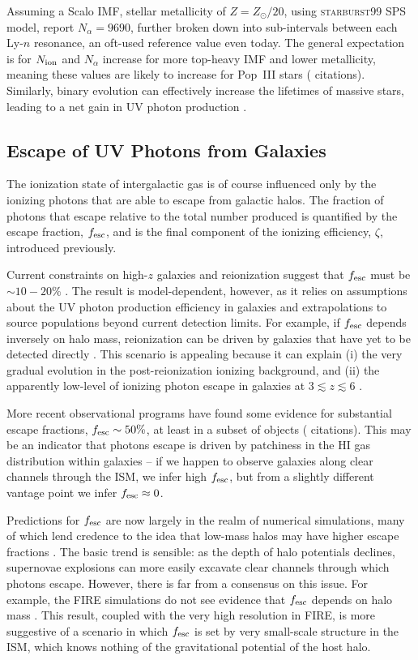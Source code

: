 Assuming a Scalo IMF, stellar metallicity of $Z=Z_{\odot}/20$, using \textsc{starburst99} SPS model, \cite{Barkana2005} report $N_{\alpha}=9690$, further broken down into sub-intervals between each Ly-$n$ resonance, an oft-used reference value even today. The general expectation is for $N_{\text{ion}}$ and $N_{\alpha}$ increase for more top-heavy IMF and lower metallicity, meaning these values are likely to increase for Pop~III stars ({\color{red} citations}). Similarly, binary evolution can effectively increase the lifetimes of massive stars, leading to a net gain in UV photon production \cite{Stanway2016}.


\subsection{Escape of UV Photons from Galaxies}
The ionization state of intergalactic gas is of course influenced only by the ionizing photons that are able to escape from galactic halos. The fraction of photons that escape relative to the total number produced is quantified by the escape fraction, $f_{\text{esc}}$, and is the final component of the ionizing efficiency, $\zeta$, introduced previously. 

Current constraints on high-$z$ galaxies and reionization suggest that $f_{\text{esc}}$ must be $\sim 10-20\%$ \cite{Robertson2015}. The result is model-dependent, however, as it relies on assumptions about the UV photon production efficiency in galaxies and extrapolations to source populations beyond current detection limits. For example, if $f_{\text{esc}}$ depends inversely on halo mass, reionization can be driven by galaxies that have yet to be detected directly \cite{Finkelstein2018}. This scenario is appealing because it can explain (i) the very gradual evolution in the post-reionization ionizing background, and (ii) the apparently low-level of ionizing photon escape in galaxies at $3 \lesssim z \lesssim 6$ \cite{Shapley2003}. 

More recent observational programs have found some evidence for substantial escape fractions, $f_{\text{esc}} \sim 50\%$, at least in a subset of objects ({\color{red} citations}). This may be an indicator that photons escape is driven by patchiness in the HI gas distribution within galaxies -- if we happen to observe galaxies along clear channels through the ISM, we infer high $f_{\text{esc}}$, but from a slightly different vantage point we infer $f_{\text{esc}} \approx 0$. 

Predictions for $f_{\text{esc}}$ are now largely in the realm of numerical simulations, many of which lend credence to the idea that low-mass halos may have higher escape fractions \cite{Kimm2014}. The basic trend is sensible: as the depth of halo potentials declines, supernovae explosions can more easily excavate clear channels through which photons escape. However, there is far from a consensus on this issue. For example, the \textsc{FIRE} simulations do not see evidence that $f_{\text{esc}}$ depends on halo mass \cite{Ma2015}. This result, coupled with the very high resolution in \textsc{FIRE}, is more suggestive of a scenario in which $f_{\text{esc}}$ is set by very small-scale structure in the ISM, which knows nothing of the gravitational potential of the host halo. 

